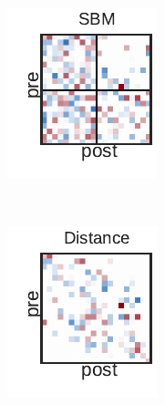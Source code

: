 \begin{figure}[t!]
\begin{subfigure}[b]{1.10in}
  \end{subfigure}
  ~
  \hspace{-.1in}
  \begin{subfigure}[b]{1.10in}
    \centering
    \includegraphics[width=\textwidth]{figures/ch3/SBM-Gaussian.pdf}
  \end{subfigure}
  ~
  \hspace{-.1in}
  \begin{subfigure}[b]{1.10in}
    \centering
    \includegraphics[width=\textwidth]{figures/ch3/Distance-Gaussian.pdf}

\end{subfigure}
\end{figure}
